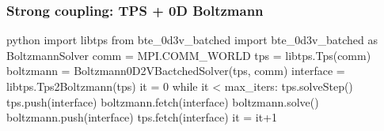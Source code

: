 \documentclass[mathserif, aspectratio=169]{beamer}
\newcommand{\vect}[1]{\boldsymbol{#1}}
\begin{document}
\begin{frame}[fragile]
\frametitle{Strong coupling: TPS + 0D Boltzmann}
\begin{mintedbox}{python}%
import libtps
from   bte_0d3v_batched import bte_0d3v_batched as BoltzmannSolver
comm = MPI.COMM_WORLD
tps = libtps.Tps(comm)
boltzmann = Boltzmann0D2VBactchedSolver(tps, comm)
interface = libtps.Tps2Boltzmann(tps)
it = 0
while it < max_iters:
    tps.solveStep()
    tps.push(interface)
    boltzmann.fetch(interface)
    boltzmann.solve()
    boltzmann.push(interface)
    tps.fetch(interface)
    it = it+1
\end{mintedbox}
\end{frame}

\end{document}
